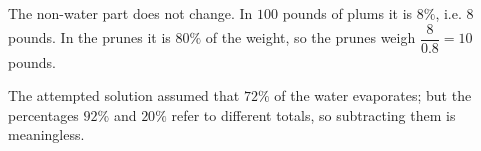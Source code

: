 The non-water part does not change. In $100$ pounds of plums it is $8\%$, i.e. $8$ pounds. In the prunes it is $80\%$ of the weight, so the prunes weigh $\dfrac{8}{0.8}=\boxed{10}$ pounds.

The attempted solution assumed that $72\%$ of the water evaporates; but the percentages $92\%$ and $20\%$ refer to different totals, so subtracting them is meaningless.
